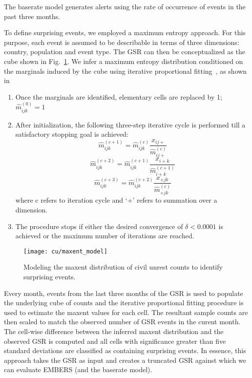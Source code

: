 The baserate model generates alerts using the rate of occurrence of events in the past three months. 

To define surprising events, 
we employed a maximum entropy approach. For this purpose, each event is assumed
to be describable
in terms of three dimensions: country, population and event type. The GSR can then be conceptualized
as the cube shown in Fig.~\ref{fig:maxent_model}. We infer a maximum entropy distribution conditioned on the marginals
induced by the cube using iterative proportional fitting~\cite{bishop2007discrete}, as shown in 

\begin{enumerate}
\item Once the marginals are identified, elementary cells are replaced by 1; $\widehat{m}^{(0)}_{ijk}=1$
\item After initialization, the following three-step iterative cycle is performed till a satisfactory stopping goal is achieved:
$$\widehat{m}^{(c+1)}_{ijk} = \widehat{m}^{(c)}_{ijk}\frac{x_{ij+}}{\widehat{m}^{(c)}_{ij+}}$$
$$\widehat{m}^{(c+2)}_{ijk} = \widehat{m}^{(c+1)}_{ijk}\frac{x_{i+k}}{\widehat{m}^{(c+1)}_{i+k}}$$
$$\widehat{m}^{(c+3)}_{ijk} = \widehat{m}^{(c+2)}_{ijk}\frac{x_{+jk}}{\widehat{m}^{(c)}_{+jk}}$$
where c refers to iteration cycle and `+' refers to summation over a dimension. 
\item The procedure stops if either the desired convergence of $\delta < 0.0001$ is achieved or the maximum number of iterations are reached.
\end{enumerate}


\begin{figure}[H]
\centering
\texttt{[image: cu/maxent\_model]}
\caption{Modeling the maxent distribution of civil unrest counts to identify surprising events.}
\label{fig:maxent_model}
\end{figure}

Every month, events from the last three months of the
GSR is used to populate the underlying cube of counts and the iterative proportional fitting procedure is
used to estimate the maxent values for each cell. The resultant sample counts are then scaled to
match the observed number of GSR events in the curent month. The cell-wise difference between the inferred
maxent distribution and the observed GSR is computed and all cells with significance greater than five standard
deviations are classified as containing surprising events. In essence, this approach takes the GSR as input and
creates a truncated GSR against which we can evaluate EMBERS (and the baserate model).

